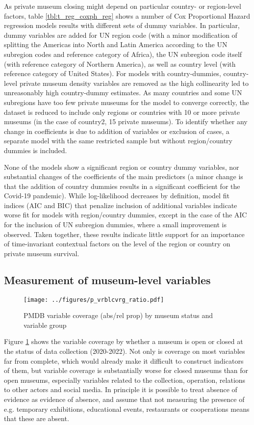 \documentclass[12pt]{article}
\begin{document}
As private museum closing might depend on particular country- or region-level factors, table \ref{tbl:t_reg_coxph_reg} shows a number of Cox Proportional Hazard regression models results with different sets of dummy variables.
In particular, dummy variables are added for UN region code (with a minor modification of splitting the Americas into North and Latin America according to the UN subregion codes and reference category of Africa), the UN subregion code itself (with reference category of Northern America), as well as country level (with reference category of United States).
For models with country-dummies, country-level private museum density variables are removed as the high collinearity led to unreasonably high country-dummy estimates.
As many countries and some UN subregions have too few private museums for the model to converge correctly, the dataset is reduced to include only regions or countries with 10 or more private museums (in the case of country2, 15 private museums).
To identify whether any change in coefficients is due to addition of variables or exclusion of cases, a separate model with the same restricted sample but without region/country dummies is included.


None of the models show a significant region or country dummy variables, nor substantial changes of the coefficients of the main predictors (a minor change is that the addition of country dummies results in a significant coefficient for the Covid-19 pandemic).
While log-likelihood decreases by definition, model fit indices (AIC and BIC) that penalize inclusion of additional variables indicate worse fit for models with region/country dummies, except in the case of the AIC for the inclusion of UN subregion dummies, where a small improvement is observed.
Taken together, these results indicate little support for an importance of time-invariant contextual factors on the level of the region or country on private museum survival. 
\subsection*{Measurement of museum-level variables}


\begin{figure}[htbp]
\centering
\texttt{[image: ../figures/p\_vrblcvrg\_ratio.pdf]}
\caption{\label{fig:p_vrblcvrg_ratio}PMDB variable coverage (abs/rel prop) by museum status and variable group}
\end{figure}

Figure \ref{fig:p_vrblcvrg_ratio} shows the variable coverage by whether a museum is open or closed at the status of data collection (2020-2022).
Not only is coverage on most variables far from complete, which would already make it difficult to construct indicators of them, but variable coverage is substantially worse for closed museums than for open museums, especially variables related to the collection, operation, relations to other actors and social media.
In principle it is possible to treat absence of evidence as evidence of absence, and assume that not measuring the presence of e.g. temporary exhibitions, educational events, restaurants or cooperations means that these are absent.
\end{document}
